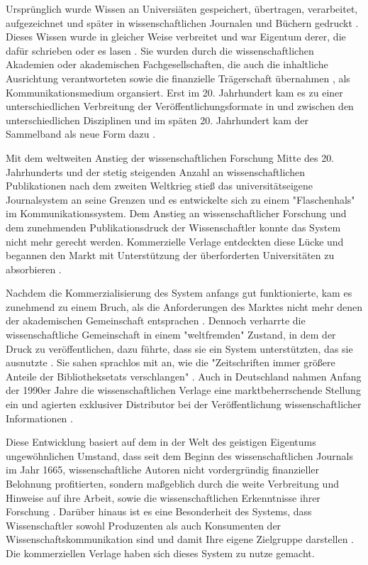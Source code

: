 Ursprünglich wurde Wissen an Universiäten gespeichert, übertragen, verarbeitet, aufgezeichnet und später in wissenschaftlichen Journalen und Büchern gedruckt \cite{kittler_2004}. Dieses Wissen wurde in gleicher Weise verbreitet \cite{hagner_2015_sache_buches} und war Eigentum derer, die dafür schrieben oder es lasen \cite{epaa_Weiner_2001}. Sie wurden durch die wissenschaftlichen Akademien oder akademischen Fachgesellschaften, die auch die inhaltliche Ausrichtung verantworteten sowie die finanzielle Trägerschaft übernahmen \cite{suchen}, als Kommunikationsmedium organsiert. Erst im 20. Jahrhundert kam es zu einer unterschiedlichen Verbreitung der Veröffentlichungsformate in und zwischen den unterschiedlichen Disziplinen und im späten 20. Jahrhundert kam der Sammelband als neue Form dazu \cite{hagner_2015_sache_buches}.

Mit dem weltweiten Anstieg der wissenschaftlichen Forschung Mitte des 20. Jahrhunderts und der stetig steigenden Anzahl an wissenschaftlichen Publikationen nach dem zweiten Weltkrieg stieß das universitätseigene Journalsystem an seine Grenzen und es entwickelte sich zu einem "Flaschenhals" \cite{epaa_Weiner_2001} im Kommunikationssystem. Dem Anstieg an wissenschaftlicher Forschung und dem zunehmenden Publikationsdruck der Wissenschaftler konnte das System nicht mehr gerecht werden. Kommerzielle Verlage entdeckten diese Lücke und begannen den Markt mit Unterstützung der überforderten Universitäten zu absorbieren \cite{Hirschi_2015_buch_oa}.

Nachdem die Kommerzialisierung des System anfangs gut funktionierte, kam es zunehmend zu einem Bruch, als die Anforderungen des Marktes nicht mehr denen der akademischen Gemeinschaft entsprachen \cite{epaa_Weiner_2001}. Dennoch verharrte die wissenschaftliche Gemeinschaft in einem "weltfremden" Zustand, in dem der Druck zu veröffentlichen, dazu führte, dass sie ein System unterstützten, das sie ausnutzte \cite{epaa_Weiner_2001}. Sie sahen sprachlos mit an, wie die "Zeitschriften immer größere Anteile der Bibliotheksetats verschlangen" \cite{hagner_2015_sache_buches}. Auch in Deutschland nahmen Anfang der 1990er Jahre die wissenschaftlichen Verlage eine marktbeherrschende Stellung ein und agierten exklusiver Distributor bei der Veröffentlichung wissenschaftlicher Informationen \cite{schloegl_2005} \cite{offhaus_2012_institutionelle_repos}.

Diese Entwicklung basiert auf dem in der Welt des geistigen Eigentums ungewöhnlichen Umstand, dass seit dem Beginn des wissenschaftlichen Journals im Jahr 1665, wissenschaftliche Autoren nicht vordergründig finanzieller Belohnung profitierten, sondern maßgeblich durch die weite Verbreitung und Hinweise auf ihre Arbeit, sowie die wissenschaftlichen Erkenntnisse ihrer Forschung \cite{albert_2006_open_implications}. Darüber hinaus ist es eine Besonderheit des Systems, dass Wissenschaftler sowohl Produzenten als auch Konsumenten der Wissenschaftskommunikation sind und damit Ihre eigene Zielgruppe darstellen \cite{Hess_2006}. Die kommerziellen Verlage haben sich dieses System zu nutze gemacht.

